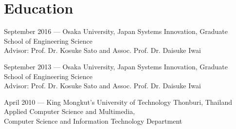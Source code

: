 \documentclass[]{resume-enhanced}
\begin{document}
\begin{minipage}[t]{0.55\textwidth} 
\section{Education} 

\location
{	
	September 2016 --- Osaka University, Japan
}
Systems Innovation, Graduate School of Engineering Science \\
Advisor: Prof. Dr. Kosuke Sato and Assoc. Prof. Dr. Daisuke Iwai
\sectionsep

\location
{
	September 2013 --- Osaka University, Japan
}
Systems Innovation, Graduate School of Engineering Science \\
Advisor: Prof. Dr. Kosuke Sato and Assoc. Prof. Dr. Daisuke Iwai
\sectionsep

\location
{
	April 2010 --- King Mongkut's University of Technology Thonburi, Thailand
}
Applied Computer Science and Multimedia, \\ 
Computer Science and Information Technology Department \\
\sectionsep

\end{minipage}
\hfill
\end{document}
